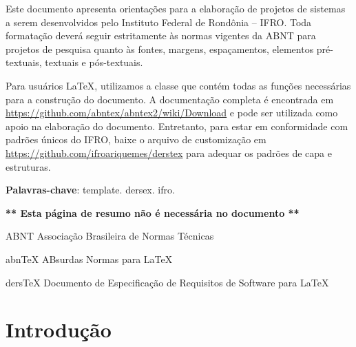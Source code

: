 \documentclass[12pt,openright,a4paper,brazil]{abntex2}
\begin{document}
 

\imprimircapa

\begin{resumo}
	Este documento apresenta orientações para a elaboração de projetos de sistemas a serem desenvolvidos pelo Instituto Federal de Rondônia -- IFRO. Toda formatação deverá seguir estritamente às normas vigentes da ABNT para projetos de pesquisa quanto às fontes, margens, espaçamentos, elementos pré-textuais, textuais e pós-textuais. 
	
	Para usuários \LaTeX, utilizamos a classe \abnTeX que contém todas as funções necessárias para a construção do documento. A documentação completa é encontrada em \url{https://github.com/abntex/abntex2/wiki/Download} e pode ser utilizada como apoio na elaboração do documento. Entretanto, para estar em conformidade com padrões únicos do IFRO, baixe o arquivo de customização em \url{https://github.com/ifroariquemes/derstex} para adequar os padrões de capa e estruturas. 
	
	\vspace{\onelineskip}
	\noindent
	\textbf{Palavras-chave}: template. dersex. ifro.
	
	\vspace{\onelineskip}
	\centering \color{red} \textbf{** Esta página de resumo não é necessária no documento **}
	
\end{resumo}

\listoffigures*
\cleardoublepage

\listoftables*
\cleardoublepage

\begin{siglas}
	\item[ABNT] Associação Brasileira de Normas Técnicas
	\item[abnTeX] ABsurdas Normas para \LaTeX
	\item[dersTeX] Documento de Especificação de Requisitos de Software para \LaTeX
\end{siglas}

\tableofcontents*
\cleardoublepage

\textual

\chapter*[Introdução]{Introdução}
\end{document}
